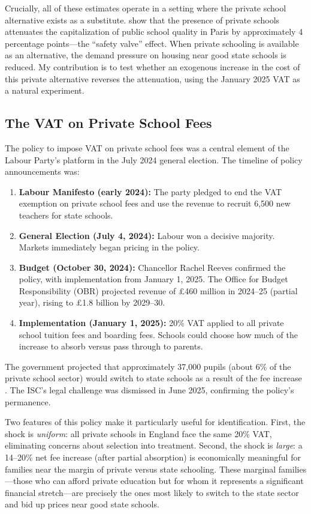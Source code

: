 \documentclass[12pt]{article}
\begin{document}
Crucially, all of these estimates operate in a setting where the private school alternative exists as a substitute. \citet{fack2010} show that the presence of private schools attenuates the capitalization of public school quality in Paris by approximately 4 percentage points---the ``safety valve'' effect. When private schooling is available as an alternative, the demand pressure on housing near good state schools is reduced. My contribution is to test whether an exogenous increase in the cost of this private alternative reverses the attenuation, using the January 2025 VAT as a natural experiment.

\subsection{The VAT on Private School Fees}

The policy to impose VAT on private school fees was a central element of the Labour Party's platform in the July 2024 general election. The timeline of policy announcements was:

\begin{enumerate}
    \item \textbf{Labour Manifesto (early 2024):} The party pledged to end the VAT exemption on private school fees and use the revenue to recruit 6,500 new teachers for state schools.
    \item \textbf{General Election (July 4, 2024):} Labour won a decisive majority. Markets immediately began pricing in the policy.
    \item \textbf{Budget (October 30, 2024):} Chancellor Rachel Reeves confirmed the policy, with implementation from January 1, 2025. The Office for Budget Responsibility (OBR) projected revenue of \pounds 460 million in 2024--25 (partial year), rising to \pounds 1.8 billion by 2029--30.
    \item \textbf{Implementation (January 1, 2025):} 20\% VAT applied to all private school tuition fees and boarding fees. Schools could choose how much of the increase to absorb versus pass through to parents.
\end{enumerate}

The government projected that approximately 37,000 pupils (about 6\% of the private school sector) would switch to state schools as a result of the fee increase \citep{hcl2024}. The ISC's legal challenge was dismissed in June 2025, confirming the policy's permanence.

Two features of this policy make it particularly useful for identification. First, the shock is \textit{uniform}: all private schools in England face the same 20\% VAT, eliminating concerns about selection into treatment. Second, the shock is \textit{large}: a 14--20\% net fee increase (after partial absorption) is economically meaningful for families near the margin of private versus state schooling. These marginal families---those who can afford private education but for whom it represents a significant financial stretch---are precisely the ones most likely to switch to the state sector and bid up prices near good state schools.
\end{document}
